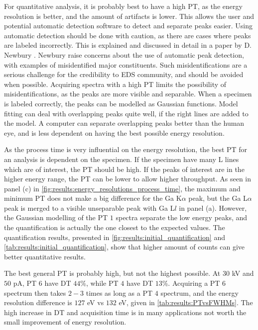 For quantitative analysis, it is probably best to have a high PT, as the energy resolution is better, and the amount of artifacts is lower.
This allows the user and potential automatic detection software to detect and separate peaks easier.
Using automatic detection should be done with caution, as there are cases where peaks are labeled incorrectly.
This is explained and discussed in detail in a paper by D. Newbury \cite{newbury_2005_misidentification}.
Newbury raise concerns about the use of automatic peak detection, with examples of misidentified major constituents.
Such misidentifications are a serious challenge for the credibility to EDS community, and should be avoided when possible.
Acquiring spectra with a high PT limits the possibility of misidentifications, as the peaks are more visible and separable.
When a specimen is labeled correctly, the peaks can be modelled as Gaussian functions.
Model fitting can deal with overlapping peaks quite well, if the right lines are added to the model.
A computer can separate overlapping peaks better than the human eye, and is less dependent on having the best possible energy resolution.


As the process time is very influential on the energy resolution, the best PT for an analysis is dependent on the specimen.
If the specimen have many L lines which are of interest, the PT should be high.
If the peaks of interest are in the higher energy range, the PT can be lower to allow higher throughput.
As seen in panel (c) in \cref{fig:results:energy_resolutions_process_time}, the maximum and minimum PT does not make a big difference for the Ga K$\alpha$ peak, but the Ga L$\alpha$ peak is merged to a visible unseparable peak with Ga L$l$ in panel (a).
However, the Gaussian modelling of the PT $1$ spectra separate the low energy peaks, and the quantification is actually the one closest to the expected values.
The quantification results, presented in \cref{fig:results:initial_quantification} and \cref{tab:results:initial_quantification}, show that higher amount of counts can give better quantitative results.


The best general PT is probably high, but not the highest possible.
At $30$ kV and $50$ pA, PT $6$ have DT $44$\%, while PT $4$ have DT $13$\%.
Acquiring a PT $6$ spectrum then takes $2-3$ times as long as a PT $4$ spectrum, and the energy resolution difference is $127$ eV vs $132$ eV, given in \cref{tab:results:PTvsFWHMs}.
The high increase in DT and acquisition time is in many applications not worth the small improvement of energy resolution.



